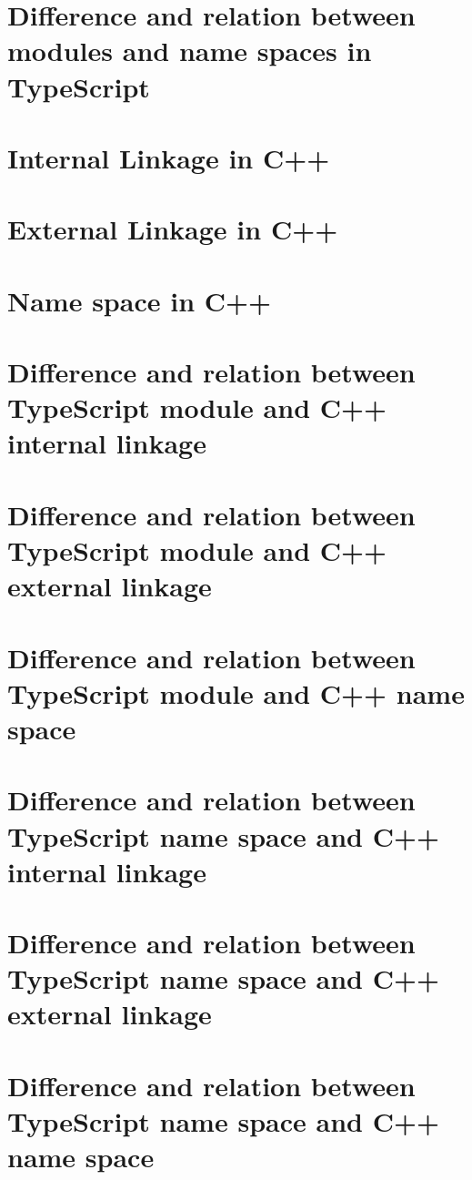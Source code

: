 \documentclass[a4paper]{report}
\begin{document}
\section{Difference and relation between modules and name spaces in TypeScript}

\section{Internal Linkage in C++}

\section{External Linkage in C++}

\section{Name space in C++}

\section{Difference and relation between TypeScript module and C++ internal linkage}

\section{Difference and relation between TypeScript module and C++ external linkage}

\section{Difference and relation between TypeScript module and C++ name space}

\section{Difference and relation between TypeScript name space and C++ internal linkage}

\section{Difference and relation between TypeScript name space and C++ external linkage}

\section{Difference and relation between TypeScript name space and C++ name space}
\end{document}
